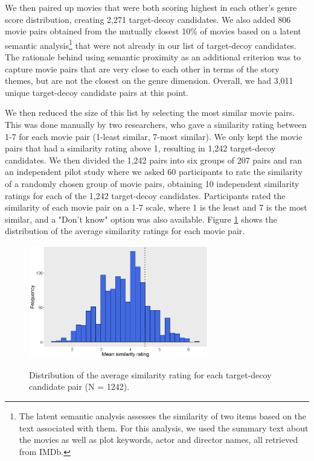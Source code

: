 \documentclass[12pt, a4paper]{article}
\begin{document}
We then paired up movies that were both scoring highest in each other's genre score distribution, creating 2,271 target-decoy candidates. We also added 806 movie pairs obtained from the mutually closest 10\% of movies based on a latent semantic analysis\footnote{The latent semantic analysis assesses the similarity of two items based on the text associated with them. For this analysis, we used the summary text about the movies as well as plot keywords, actor and director names, all retrieved from IMDb.} that were not already in our list of target-decoy candidates. The rationale behind using semantic proximity as an additional criterion was to capture movie pairs that are very close to each other in terms of the story themes, but are not the closest on the genre dimension. Overall, we had 3,011 unique target-decoy candidate pairs at this point. 

We then reduced the size of this list by selecting the most similar movie pairs. This was done manually by two researchers, who gave a similarity rating between 1-7 for each movie pair (1-least similar, 7-most similar). We only kept the movie pairs that had a similarity rating above 1, resulting in 1,242 target-decoy candidates. We then divided the 1,242 pairs into six groups of 207 pairs and ran an independent pilot study where we asked 60 participants to rate the similarity of a randomly chosen group of movie pairs, obtaining 10 independent similarity ratings for each of the 1,242 target-decoy candidates. Participants rated the similarity of each movie pair on a 1-7 scale, where 1 is the least and 7 is the most similar, and a "Don't know" option was also available. Figure \ref{fig:exp2_pilot}  shows the distribution of the average similarity ratings for each movie pair. 

 \begin{figure}[htb!]
\centering
\captionsetup{justification=centering}
\caption{Distribution of the average similarity rating for each target-decoy candidate pair (N = 1242).}
\includegraphics[width=0.7\textwidth]{exp2_pilot.png}
\label{fig:exp2_pilot}
\end{figure}
\end{document}
